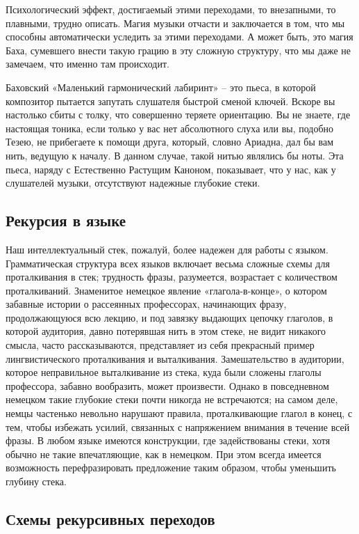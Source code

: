\documentclass[../main.tex]{subfiles}
\begin{document}
Психологический эффект, достигаемый этими переходами, то внезапными, то плавными, трудно описать. Магия музыки отчасти и заключается в том, что мы способны автоматически уследить за этими переходами. А может быть, это магия Баха, сумевшего внести такую грацию в эту сложную структуру, что мы даже не замечаем, что именно там происходит.

Баховский «Маленький гармонический лабиринт» \--- это пьеса, в которой композитор пытается запутать слушателя быстрой сменой ключей. Вскоре вы настолько сбиты с толку, что совершенно теряете ориентацию. Вы не знаете, где настоящая тоника, если только у вас нет абсолютного слуха или вы, подобно Тезею, не прибегаете к помощи друга, который, словно Ариадна, дал бы вам нить, ведущую к началу. В данном случае, такой нитью являлись бы ноты. Эта пьеса, наряду с Естественно Растущим Каноном, показывает, что у нас, как у слушателей музыки, отсутствуют надежные глубокие стеки.


\subsection{Рекурсия в языке}

Наш интеллектуальный стек, пожалуй, более надежен для работы с языком. Грамматическая структура всех языков включает весьма сложные схемы для проталкивания в стек; трудность фразы, разумеется, возрастает с количеством проталкиваний. Знаменитое немецкое явление «глагола-в-конце», о котором забавные истории о рассеянных профессорах, начинающих фразу, продолжающуюся всю лекцию, и под завязку выдающих цепочку глаголов, в которой аудитория, давно потерявшая нить в этом стеке, не видит никакого смысла, часто рассказываются, представляет из себя прекрасный пример лингвистического проталкивания и выталкивания. Замешательство в аудитории, которое неправильное выталкивание из стека, куда были сложены глаголы профессора, забавно вообразить, может произвести. Однако в повседневном немецком такие глубокие стеки почти никогда не встречаются; на самом деле, немцы частенько невольно нарушают правила, проталкивающие глагол в конец, с тем, чтобы избежать усилий, связанных с напряжением внимания в течение всей фразы. В любом языке имеются конструкции, где задействованы стеки, хотя обычно не такие впечатляющие, как в немецком. При этом всегда имеется возможность перефразировать предложение таким образом, чтобы уменьшить глубину стека.


\subsection{Схемы рекурсивных переходов}
\end{document}
